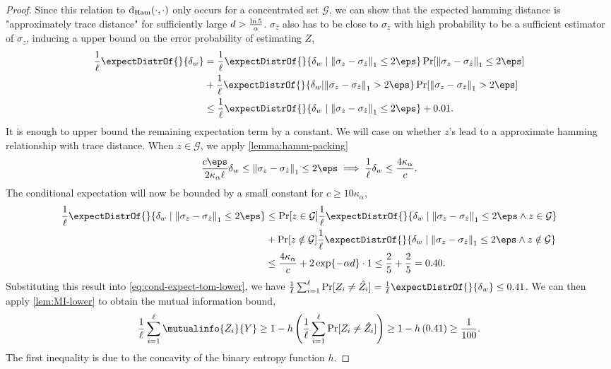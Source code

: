 \begin{proof}
   Since this relation to $\operatorname{d}_{\rm Ham}(\cdot,\cdot)$ only occurs for a concentrated set $\mathcal{G}$, we can show that the expected hamming distance is "approximately trace distance" for sufficiently large $d > \frac{\ln{5}}{\alpha}$. $\sigma_{\hat{z}}$ also has to be close to $\sigma_z$ with high probability to be a sufficient estimator of $\sigma_z$, inducing a upper bound on the error probability of estimating $Z$,
   \begin{align}
       \frac{1}{\ell} \expectDistrOf{}{\delta_w} &= \frac{1}{\ell} \expectDistrOf{}{\delta_w \mid \tracenorm{\sigma_z - \sigma_{\zest}} \leq 2 \eps} \Pr[\tracenorm{\sigma_z - \sigma_{\zest}} \leq 2 \eps] \nonumber\\
       &+ \frac{1}{\ell} \expectDistrOf{}{\delta_w | \tracenorm{\sigma_z - \sigma_{\zest}} > 2 \eps} \Pr[\tracenorm{\sigma_z - \sigma_{\zest}} > 2 \eps] \nonumber\\
       &\leq \frac{1}{\ell} \expectDistrOf{}{\delta_w \mid \tracenorm{\sigma_z - \sigma_{\zest}} \leq 2 \eps} + 0.01.  \label{eq:cond-expect-tom-lower}
   \end{align}
   It is enough to upper bound the remaining expectation term by a constant. We will case on whether $z$'s lead to a approximate hamming relationship with trace distance. When $z \in \mathcal{G}$, we apply \cref{lemma:hamm-packing}
   \begin{align*}
       \frac{c \eps}{2 \kappa_\alpha \ell} \delta_w \leq \tracenorm{\sigma_z - \sigma_{\zest}} \leq 2 \eps 
       \implies  \frac{1}{\ell} \delta_w \leq \frac{4 \kappa_\alpha}{c}.
   \end{align*}
   The conditional expectation will now be bounded by a small constant for $c \geq 10 \kappa_\alpha$,
   \begin{align*}
       \frac{1}{\ell} \expectDistrOf{}{\delta_w \mid \tracenorm{\sigma_\ptb - \sigma_{\zest}} \leq 2 \eps} &\leq \Pr[z \in \mathcal{G}]\frac{1}{\ell} \expectDistrOf{}{\delta_w \mid \tracenorm{\sigma_\ptb - \sigma_{\zest}} \leq 2 \eps \land z \in \mathcal{G}} \\
       &+\Pr[z \notin \mathcal{G}] \frac{1}{\ell} \expectDistrOf{}{\delta_w \mid \tracenorm{\sigma_z - \sigma_{\zest}} \leq 2 \eps \land z \notin \mathcal{G}} \\
       &\leq \frac{4 \kappa_\alpha}{c} +  2\exp\{-\alpha d\} \cdot 1 \leq \frac{2}{5} + \frac{2}{5} = 0.40.
   \end{align*}
   Substituting this result into \cref{eq:cond-expect-tom-lower}, we have $\frac{1}{\ell} \sum_{i=1}^\ell \Pr[Z_i \neq \hat{Z_i}] = \frac{1}{\ell} \expectDistrOf{}{\delta_w} \leq 0.41$. We can then apply \cref{lem:MI-lower} to obtain the mutual information bound,
   \begin{align*}
       \frac{1}{\ell} \sum_{i=1}^\ell \mutualinfo{Z_i}{Y} \geq 1 - h\left(\frac{1}{\ell} \sum_{i=1}^\ell \Pr[Z_i \neq \hat{Z_i}]\right) \geq 1 - h\left(0.41\right) \geq \frac{1}{100}.
   \end{align*}
   The first inequality is due to the concavity of the binary entropy function $h$.
\end{proof}